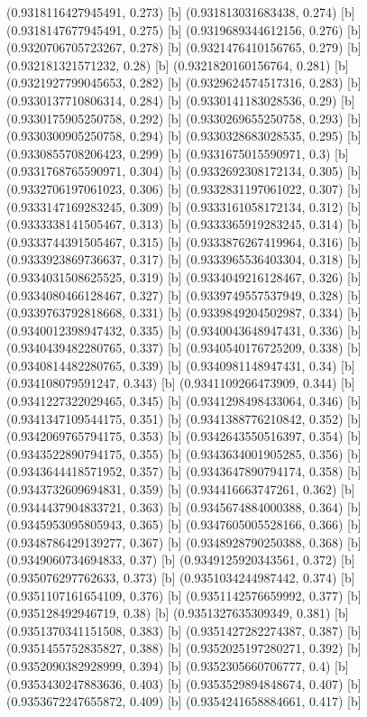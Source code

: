 {{{(0.9318116427945491, 0.273) [b] 
(0.931813031683438, 0.274) [b] 
(0.9318147677945491, 0.275) [b] 
(0.9319689344612156, 0.276) [b] 
(0.9320706705723267, 0.278) [b] 
(0.9321476410156765, 0.279) [b] 
(0.932181321571232, 0.28) [b] 
(0.9321820160156764, 0.281) [b] 
(0.9321927799045653, 0.282) [b] 
(0.9329624574517316, 0.283) [b] 
(0.9330137710806314, 0.284) [b] 
(0.9330141183028536, 0.29) [b] 
(0.9330175905250758, 0.292) [b] 
(0.9330269655250758, 0.293) [b] 
(0.9330300905250758, 0.294) [b] 
(0.9330328683028535, 0.295) [b] 
(0.9330855708206423, 0.299) [b] 
(0.9331675015590971, 0.3) [b] 
(0.9331768765590971, 0.304) [b] 
(0.9332692308172134, 0.305) [b] 
(0.9332706197061023, 0.306) [b] 
(0.9332831197061022, 0.307) [b] 
(0.9333147169283245, 0.309) [b] 
(0.9333161058172134, 0.312) [b] 
(0.9333338141505467, 0.313) [b] 
(0.9333365919283245, 0.314) [b] 
(0.9333744391505467, 0.315) [b] 
(0.9333876267419964, 0.316) [b] 
(0.9333923869736637, 0.317) [b] 
(0.9333965536403304, 0.318) [b] 
(0.9334031508625525, 0.319) [b] 
(0.9334049216128467, 0.326) [b] 
(0.9334080466128467, 0.327) [b] 
(0.9339749557537949, 0.328) [b] 
(0.9339763792818668, 0.331) [b] 
(0.9339849204502987, 0.334) [b] 
(0.9340012398947432, 0.335) [b] 
(0.9340043648947431, 0.336) [b] 
(0.9340439482280765, 0.337) [b] 
(0.9340540176725209, 0.338) [b] 
(0.9340814482280765, 0.339) [b] 
(0.9340981148947431, 0.34) [b] 
(0.934108079591247, 0.343) [b] 
(0.9341109266473909, 0.344) [b] 
(0.9341227322029465, 0.345) [b] 
(0.9341298498433064, 0.346) [b] 
(0.9341347109544175, 0.351) [b] 
(0.9341388776210842, 0.352) [b] 
(0.9342069765794175, 0.353) [b] 
(0.9342643550516397, 0.354) [b] 
(0.9343522890794175, 0.355) [b] 
(0.9343634001905285, 0.356) [b] 
(0.9343644418571952, 0.357) [b] 
(0.9343647890794174, 0.358) [b] 
(0.9343732609694831, 0.359) [b] 
(0.934416663747261, 0.362) [b] 
(0.9344437904833721, 0.363) [b] 
(0.9345674884000388, 0.364) [b] 
(0.9345953095805943, 0.365) [b] 
(0.9347605005528166, 0.366) [b] 
(0.9348786429139277, 0.367) [b] 
(0.9348928790250388, 0.368) [b] 
(0.9349060734694833, 0.37) [b] 
(0.9349125920343561, 0.372) [b] 
(0.935076297762633, 0.373) [b] 
(0.9351034244987442, 0.374) [b] 
(0.9351107161654109, 0.376) [b] 
(0.9351142576659992, 0.377) [b] 
(0.935128492946719, 0.38) [b] 
(0.9351327635309349, 0.381) [b] 
(0.9351370341151508, 0.383) [b] 
(0.9351427282274387, 0.387) [b] 
(0.9351455752835827, 0.388) [b] 
(0.9352025197280271, 0.392) [b] 
(0.9352090382928999, 0.394) [b] 
(0.9352305660706777, 0.4) [b] 
(0.9353430247883636, 0.403) [b] 
(0.9353529894848674, 0.407) [b] 
(0.9353672247655872, 0.409) [b] 
(0.9354241658884661, 0.417) [b] 
}}}
